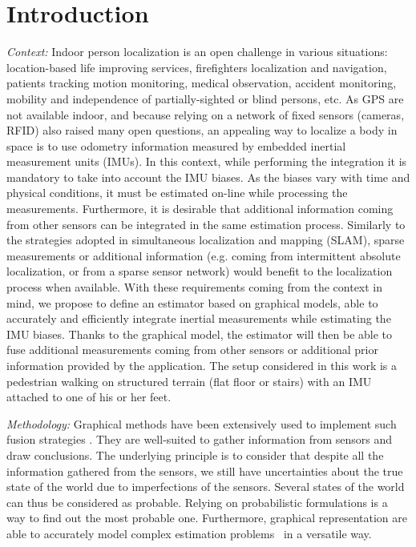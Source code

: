 
\section{Introduction}\label{sec:intro}

\textit{Context: }
Indoor person localization is an open challenge in various situations: location-based life improving services,
firefighters localization and navigation, patients tracking 
motion monitoring, medical observation, accident monitoring, mobility and independence of partially-sighted or blind persons, etc.
As GPS are not available indoor, and because relying on a network of fixed sensors (cameras, RFID) also raised many open questions, an appealing way to localize a body in space is to use odometry information measured by embedded inertial measurement units (IMUs).
In this context, while performing the integration it is mandatory to take into account the IMU biases.
As the biases vary with time and physical conditions, it must be estimated on-line while processing the measurements.
Furthermore, it is desirable that additional information coming from other sensors can be integrated in the same estimation process.
Similarly to the strategies adopted in simultaneous localization and mapping (SLAM), sparse measurements or additional information (e.g. coming from intermittent absolute localization, or from a sparse sensor network) would benefit to the localization process when available.
With these requirements coming from the context in mind, we propose to define an estimator based on graphical models, able to accurately and efficiently integrate inertial measurements while estimating the IMU biases. Thanks to the graphical model, the estimator will then be able to fuse additional measurements coming from other sensors or additional prior information provided by the application.
The setup considered in this work  is a pedestrian walking on structured terrain (flat floor or stairs) with an IMU attached to one of his or her feet.

\textit{Methodology: }
Graphical methods have been extensively used to implement such fusion strategies \cite{Thrun:ijrr:2006,Kaess:itro:2008}.
They are well-suited to gather information from sensors
and draw conclusions. The underlying principle is to consider that despite all the information gathered from the sensors, we still have uncertainties about the true state of the world due to imperfections of the sensors.
Several states of the world can thus be considered as probable.
Relying on probabilistic formulations is a way to find out the most probable one. Furthermore, graphical representation are able to accurately model 
complex estimation problems~\cite{koller2009probabilistic} in a versatile way. 

